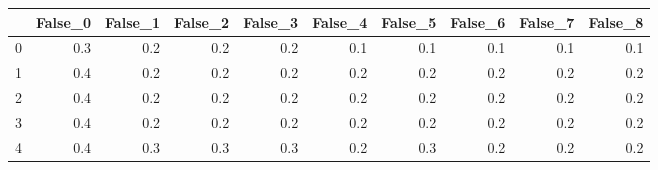 \begin{tabular}{lrrrrrrrrr}
\toprule
{} &  False\_0 &  False\_1 &  False\_2 &  False\_3 &  False\_4 &  False\_5 &  False\_6 &  False\_7 &  False\_8 \\ \hline
\midrule
0 &      0.3 &      0.2 &      0.2 &      0.2 &      0.1 &      0.1 &      0.1 &      0.1 &      0.1 \\ \hline
1 &      0.4 &      0.2 &      0.2 &      0.2 &      0.2 &      0.2 &      0.2 &      0.2 &      0.2 \\ \hline
2 &      0.4 &      0.2 &      0.2 &      0.2 &      0.2 &      0.2 &      0.2 &      0.2 &      0.2 \\ \hline
3 &      0.4 &      0.2 &      0.2 &      0.2 &      0.2 &      0.2 &      0.2 &      0.2 &      0.2 \\ \hline
4 &      0.4 &      0.3 &      0.3 &      0.3 &      0.2 &      0.3 &      0.2 &      0.2 &      0.2 \\ \hline
\bottomrule
\end{tabular}
